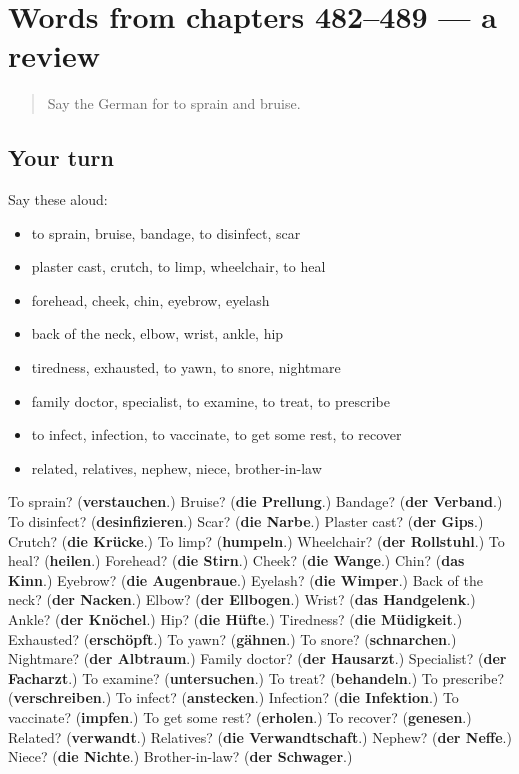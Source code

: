 \section[(dialogue)]{Words from chapters 482–489 — a review}

\label{lesson:GE-R489-review-482-489}



\begin{quote}
Say the German for to sprain and bruise.
\end{quote}

\subsection*{Your turn}
Say these aloud:

\begin{itemize}
\raggedright
  \item to sprain, bruise, bandage, to disinfect, scar
  \item plaster cast, crutch, to limp, wheelchair, to heal
  \item forehead, cheek, chin, eyebrow, eyelash
  \item back of the neck, elbow, wrist, ankle, hip
  \item tiredness, exhausted, to yawn, to snore, nightmare
  \item family doctor, specialist, to examine, to treat, to prescribe
  \item to infect, infection, to vaccinate, to get some rest, to recover
  \item related, relatives, nephew, niece, brother-in-law
\end{itemize}

\begin{tcolorbox}[breakable,colback=teal!4,colframe=teal!35!black,title={Before you move on}]
To sprain? (\textbf{verstauchen}.) Bruise? (\textbf{die Prellung}.) Bandage? (\textbf{der Verband}.) To disinfect? (\textbf{desinfizieren}.) Scar? (\textbf{die Narbe}.) Plaster cast? (\textbf{der Gips}.) Crutch? (\textbf{die Krücke}.) To limp? (\textbf{humpeln}.) Wheelchair? (\textbf{der Rollstuhl}.) To heal? (\textbf{heilen}.) Forehead? (\textbf{die Stirn}.) Cheek? (\textbf{die Wange}.) Chin? (\textbf{das Kinn}.) Eyebrow? (\textbf{die Augenbraue}.) Eyelash? (\textbf{die Wimper}.) Back of the neck? (\textbf{der Nacken}.) Elbow? (\textbf{der Ellbogen}.) Wrist? (\textbf{das Handgelenk}.) Ankle? (\textbf{der Knöchel}.) Hip? (\textbf{die Hüfte}.) Tiredness? (\textbf{die Müdigkeit}.) Exhausted? (\textbf{erschöpft}.) To yawn? (\textbf{gähnen}.) To snore? (\textbf{schnarchen}.) Nightmare? (\textbf{der Albtraum}.) Family doctor? (\textbf{der Hausarzt}.) Specialist? (\textbf{der Facharzt}.) To examine? (\textbf{untersuchen}.) To treat? (\textbf{behandeln}.) To prescribe? (\textbf{verschreiben}.) To infect? (\textbf{anstecken}.) Infection? (\textbf{die Infektion}.) To vaccinate? (\textbf{impfen}.) To get some rest? (\textbf{erholen}.) To recover? (\textbf{genesen}.) Related? (\textbf{verwandt}.) Relatives? (\textbf{die Verwandtschaft}.) Nephew? (\textbf{der Neffe}.) Niece? (\textbf{die Nichte}.) Brother-in-law? (\textbf{der Schwager}.)
\end{tcolorbox}
